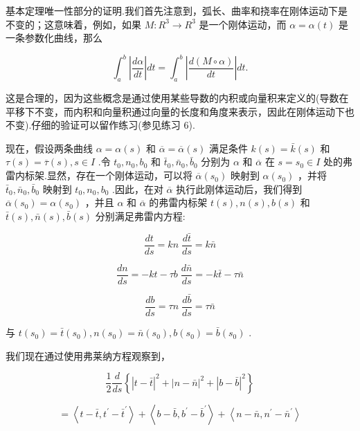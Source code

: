 基本定理唯一性部分的证明.我们首先注意到，弧长、曲率和挠率在刚体运动下是不变的；这意味着，例如，如果 \(M : {R}^{3} \rightarrow  {R}^{3}\) 是一个刚体运动，而 \(\alpha  = \alpha \left( t\right)\) 是一条参数化曲线，那么

\[
{\int }_{a}^{b}\left| \frac{d\alpha }{dt}\right| {dt} = {\int }_{a}^{b}\left| \frac{d\left( {M \circ  \alpha }\right) }{dt}\right| {dt}.
\]

这是合理的，因为这些概念是通过使用某些导数的内积或向量积来定义的(导数在平移下不变，而内积和向量积通过向量的长度和角度来表示，因此在刚体运动下也不变).仔细的验证可以留作练习(参见练习 6).

现在，假设两条曲线 \(\alpha  = \alpha \left( s\right)\) 和 \(\overline{\alpha } = \overline{\alpha }\left( s\right)\) 满足条件 \(k\left( s\right)  = \bar{k}\left( s\right)\) 和 \(\tau \left( s\right)  = \overline{\tau }\left( s\right) ,s \in  I\) .令 \({t}_{0},{n}_{0},{b}_{0}\) 和 \({\bar{t}}_{0},{\bar{n}}_{0},{\bar{b}}_{0}\) 分别为 \(\alpha\) 和 \(\overline{\alpha }\) 在 \(s = {s}_{0} \in  I\) 处的弗雷内标架.显然，存在一个刚体运动，可以将 \(\overline{\alpha }\left( {s}_{0}\right)\) 映射到 \(\alpha \left( {s}_{0}\right)\) ，并将 \({\bar{t}}_{0},{\bar{n}}_{0},{\bar{b}}_{0}\) 映射到 \({t}_{0},{n}_{0},{b}_{0}\) .因此，在对 \(\overline{\alpha }\) 执行此刚体运动后，我们得到 \(\overline{\alpha }\left( {s}_{0}\right)  = \alpha \left( {s}_{0}\right)\) ，并且 \(\alpha\) 和 \(\overline{\alpha }\) 的弗雷内标架 \(t\left( s\right) ,n\left( s\right) ,b\left( s\right)\) 和 \(\bar{t}\left( s\right) ,\bar{n}\left( s\right) ,\bar{b}\left( s\right)\) 分别满足弗雷内方程:

\[
\frac{dt}{ds} = {kn}\;\frac{d\bar{t}}{ds} = k\bar{n}
\]

\[
\frac{dn}{ds} =  - {kt} - {\tau b}\;\frac{d\bar{n}}{ds} =  - k\bar{t} - \tau \bar{n}
\]

\[
\frac{db}{ds} = {\tau n}\;\frac{d\bar{b}}{ds} = \tau \bar{n}
\]

与 \(t\left( {s}_{0}\right)  = \bar{t}\left( {s}_{0}\right) ,n\left( {s}_{0}\right)  = \bar{n}\left( {s}_{0}\right) ,b\left( {s}_{0}\right)  = \bar{b}\left( {s}_{0}\right)\) .

我们现在通过使用弗莱纳方程观察到，

\[
\frac{1}{2}\frac{d}{ds}\left\{  {{\left| t - \bar{t}\right| }^{2} + {\left| n - \bar{n}\right| }^{2} + {\left| b - \bar{b}\right| }^{2}}\right\}
\]

\[
= \left\langle  {t - \bar{t},{t}^{\prime } - {\bar{t}}^{\prime }}\right\rangle   + \left\langle  {b - \bar{b},{b}^{\prime } - {\bar{b}}^{\prime }}\right\rangle   + \left\langle  {n - \bar{n},{n}^{\prime } - {\bar{n}}^{\prime }}\right\rangle
\]

